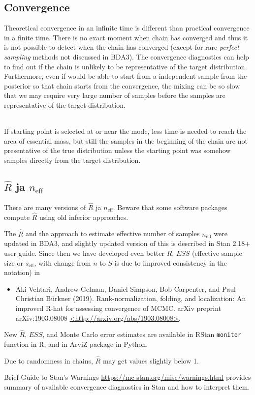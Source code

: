 \documentclass[a4paper,11pt,english]{article}
\def\eff{\mathrm{eff}}
\begin{document}
\subsection*{Convergence}

Theoretical convergence in an infinite time is different than
practical convergence in a finite time. There is no exact moment when
chain has converged and thus it is not possible to detect when the
chain has converged (except for rare \emph{perfect sampling} methods
not discussed in BDA3). The convergence diagnostics can help to find
out if the chain is unlikely to be representative of the target
distribution. Furthermore, even if would be able to start from a
independent sample from the posterior so that chain starts from the
convergence, the mixing can be so slow that we may require very large
number of samples before the samples are representative of the target
distribution.

~\\
If starting point is selected at or near the mode, less time is needed
to reach the area of essential mass, but still the samples in the
beginning of the chain are not presentative of the true distribution
unless the starting point was somehow samples directly from the target
distribution. 

\subsection*{$\hat{R}$ ja $n_\eff$}

There are many versions of $\hat{R}$ ja $n_\eff$. Beware that some
software packages compute $\hat{R}$ using old inferior approaches.

The $\hat{R}$ and the approach to estimate effective number of samples
$n_\eff$ were updated in BDA3, and slightly updated version of this is
described in Stan 2.18+ user guide. Since then we have developed even
better $\hat{R}$, $ESS$ (effective sample size or $s_\eff$, with
change from $n$ to $S$ is due to improved consistency in the notation)
in
 \begin{itemize}
 \item Aki Vehtari, Andrew Gelman, Daniel Simpson, Bob Carpenter, and
   Paul-Christian Bürkner (2019). Rank-normalization, folding, and
   localization: An improved R-hat for assessing convergence of
   MCMC. arXiv preprint
   arXiv:1903.08008 \url{<http://arxiv.org/abs/1903.08008>}.
 \end{itemize}
 New $\hat{R}$, $ESS$, and Monte Carlo error estimates are available
 in RStan {\tt monitor} function in R, and in ArviZ package in Python.
 
Due to randomness in chains, $\hat{R}$ may get values slightly below 1.

Brief Guide to Stan's Warnings
\url{https://mc-stan.org/misc/warnings.html} provides summary of
available convergence diagnostics in Stan and how to interpret them.
\end{document}
